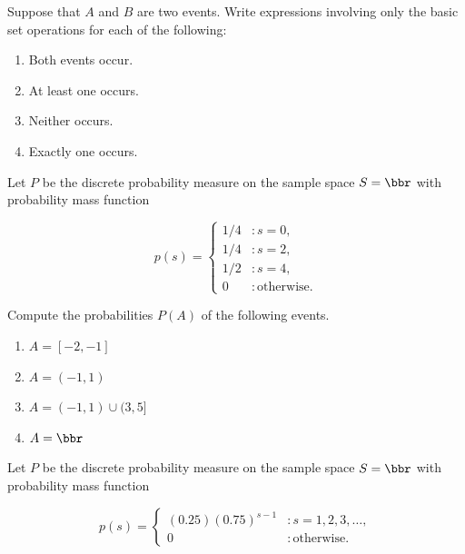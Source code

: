 \documentclass[12pt,reqno]{amsart}
\begin{document}
\prob Suppose that $A$ and $B$ are two events. Write expressions involving only the basic set operations for each of the following:

\bigskip
\begin{enumerate}
    \item Both events occur.\vfill
    \item At least one occurs.\vfill
    \item Neither occurs.\vfill
    \item Exactly one occurs.\vfill
\end{enumerate}








\newpage
\prob Let $P$ be the discrete probability measure on the sample space $S=\bbr$ with probability mass function

    \[p(s) = \begin{cases}
    1/4 & : s=0, \\
    1/4 & : s=2, \\
    1/2 & : s=4, \\
    0 & : \text{otherwise}.
    \end{cases}\]

Compute the probabilities $P(A)$ of the following events.

\medskip
\begin{enumerate}
    \item $A = [-2, -1]$\vfill
    
    

    \item $A = (-1, 1)$\vfill
    


    \item $A = (-1, 1) \cup (3,5]$\vfill
    

    
    \item $A = \bbr$\vfill
    

\end{enumerate}










\prob Let $P$ be the discrete probability measure on the sample space $S=\bbr$ with probability mass function

\[p(s) = \begin{cases}
    (0.25) (0.75)^{s-1} & : s=1, 2, 3, \ldots, \\
0 & : \text{otherwise}.
\end{cases}\]
\end{document}
